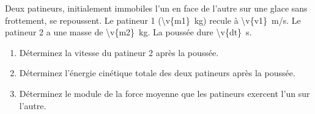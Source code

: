 Deux patineurs, initialement immobiles l'un en face de l'autre sur une glace sans frottement, se repoussent. Le patineur 1 (\qty{\v{m1}}{kg}) recule à \qty{\v{v1}}{m/s}. Le patineur 2 a une masse de \qty{\v{m2}}{kg}. La poussée dure \qty{\v{dt}}{s}.

\begin{enumerate}[label=\alph*)]
    \item Déterminez la vitesse du patineur 2 après la poussée.
    \item Déterminez l'énergie cinétique totale des deux patineurs après la poussée.
    \item Déterminez le module de la force moyenne que les patineurs exercent l'un sur l'autre.
\end{enumerate}
